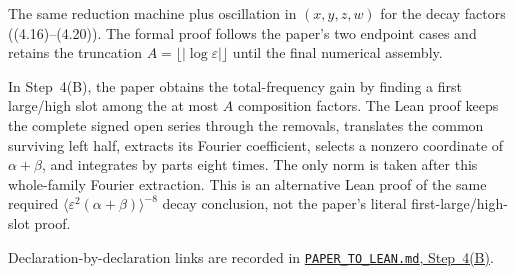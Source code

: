 \begin{lemma}\label{R-324}
  \leanok
  The same reduction machine plus oscillation in \((x,y,z,w)\) for the
  decay factors ((4.16)--(4.20)).  The formal proof follows the paper's
  two endpoint cases and retains the truncation
  \(A = \lfloor|\log\varepsilon|\rfloor\) until the final numerical
  assembly.

  In Step~4(B), the paper obtains the total-frequency gain by finding a
  first large/high slot among the at most \(A\) composition factors.  The
  Lean proof keeps the complete signed open series through the removals,
  translates the common surviving left half, extracts its Fourier
  coefficient, selects a nonzero coordinate of \(\alpha+\beta\), and
  integrates by parts eight times.  The only norm is taken after this
  whole-family Fourier extraction.  This is an alternative Lean proof of
  the same required
  \(\langle\varepsilon^2(\alpha+\beta)\rangle^{-8}\) decay conclusion,
  not the paper's literal first-large/high-slot proof.

  Declaration-by-declaration links are recorded in
  \href{https://github.com/sairmath/anderson4d_lean/blob/main/docs/PAPER_TO_LEAN.md#step-4b}
  {\texttt{PAPER\_TO\_LEAN.md}, Step~4(B)}.
\end{lemma}
